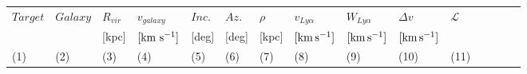 \documentclass[iop]{emulateapj-rtx4}
\begin{document}
\begin{table}[ht]\footnotesize
\begin{center}
\begin{tabular}{l l l l l l l l l l l l l l l}
 \hline \hline
  $Target$	&  $Galaxy$  & $R_{vir}$        & $v_{galaxy}$ 	   	  &  $Inc.$               &  $Az.$ 	       & $\rho$		   & $v_{Ly\alpha}$	 	  	& $W_{Ly\alpha}$  & $\Delta v$  			 & $\mathcal{L}$ \\ 
  	  &       & \scriptsize [kpc] & \scriptsize  $\rm [km ~s^{-1}]$ & \scriptsize [deg] & \scriptsize [deg] & \scriptsize [kpc] & \scriptsize  $\rm [km\, s^{-1}]$ & \scriptsize $\rm [km\, s^{-1}]$ & \scriptsize  $\rm [km\, s^{-1}]$ &  \\
 \scriptsize (1) & \scriptsize (2) & \scriptsize (3)    & \scriptsize (4)     & \scriptsize (5)    & \scriptsize (6)   & \scriptsize  (7)   & \scriptsize (8) & \scriptsize (9) & \scriptsize (10) & \scriptsize (11) \\ \hline \hline


\end{tabular}
\end{center}
\end{table}
\end{document}
